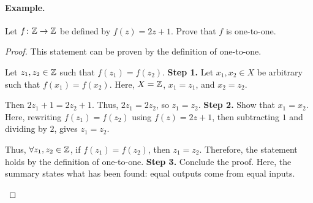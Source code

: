\paragraph{Example.}
\begin{exercise}{
    Let $f \colon \mathbb{Z} \to \mathbb{Z}$ be defined by $f(z) = 2z + 1$. %
    Prove that $f$ is one-to-one.
}
\end{exercise}
\begin{proof}{
    This statement can be proven by the definition of one-to-one.

    \begin{annotatedpanel}[Setup.]{
        Let $z_1, z_2 \in \mathbb{Z}$ such that $f(z_1) = f(z_2)$.
    }{
        \textbf{Step 1.} Let $x_1, x_2 \in X$ be arbitrary such that %
        $f(x_1) = f(x_2)$. %
        Here, $X = \mathbb{Z}$, $x_1 = z_1$, and $x_2 = z_2$.
    }
    \end{annotatedpanel}

    \begin{annotatedpanel}[Verification.]{
        Then $2z_1 + 1 = 2z_2 + 1$. %
        Thus, $2z_1 = 2z_2$, so $z_1 = z_2$.
    }{
        \textbf{Step 2.} Show that $x_1 = x_2$. %
        Here, rewriting $f(z_1) = f(z_2)$ using $f(z) = 2z + 1$, %
        then subtracting $1$ and dividing by $2$, gives $z_1 = z_2$.
    }
    \end{annotatedpanel}

    \begin{annotatedpanel}[Conclusion.]{
        Thus, $\forall z_1, z_2 \in \mathbb{Z}$, if $f(z_1) = f(z_2)$, %
        then $z_1 = z_2$. %
        Therefore, the statement holds by the definition of one-to-one. %
        \qedhere
    }{
        \textbf{Step 3.} Conclude the proof. %
        Here, the summary states what has been found: %
        equal outputs come from equal inputs.
    }
    \end{annotatedpanel}
}
\end{proof}